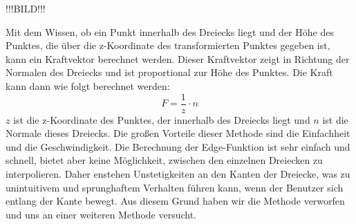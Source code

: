 \documentclass[conference]{IEEEtran}
\begin{document}
!!!BILD!!!

Mit dem Wissen, ob ein Punkt innerhalb des Dreiecks liegt und der Höhe des Punktes, die über 
die z-Koordinate des transformierten Punktes gegeben ist, kann ein Kraftvektor berechnet werden. 
Dieser Kraftvektor zeigt in Richtung der Normalen des Dreiecks und ist proportional zur Höhe des Punktes. 
Die Kraft kann dann wie folgt berechnet werden:
\begin{equation}
    F = \frac{1}{z} \cdot n
\end{equation}
$z$ ist die z-Koordinate des Punktes, der innerhalb des Dreiecks liegt und $n$ ist die Normale dieses Dreiecks.
Die großen Vorteile dieser Methode sind die Einfachheit und die Geschwindigkeit. 
Die Berechnung der Edge-Funktion ist sehr einfach und schnell, bietet aber keine Möglichkeit, zwischen den einzelnen Dreiecken zu interpolieren. Daher enstehen Unstetigkeiten an den Kanten der Dreiecke, was zu unintuitivem und sprunghaftem Verhalten führen kann, wenn der Benutzer sich entlang der Kante 
bewegt. Aus diesem Grund haben wir die Methode verworfen und uns an einer weiteren Methode versucht.
\end{document}

